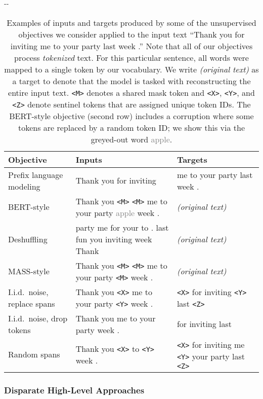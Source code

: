 \documentclass[twoside,11pt]{article}
\newlength{\offsetpage}
\newenvironment{widepage}{\begin{adjustwidth}{-\offsetpage}{-\offsetpage}\addtolength{\textwidth}{2\offsetpage}}{\end{adjustwidth}}
\begin{document}
\begin{table}
\footnotesize
\begin{widepage}
\centering
\begin{tabular}{l l l}
\toprule
    Objective & Inputs & Targets   \\
\midrule
    Prefix language modeling & Thank you for inviting & me to your party last week . \\
    BERT-style \cite{devlin2018bert} & Thank you \texttt{<M>} \texttt{<M>} me to your party \textcolor{gray}{apple} week . & \textit{(original text)}  \\
    Deshuffling & party me for your to . last fun you inviting week Thank & \textit{(original text)} \\
    MASS-style \cite{song2019mass} & Thank you \texttt{<M>} \texttt{<M>} me to your party \texttt{<M>} week . & \textit{(original text)} \\
    I.i.d.\ noise, replace spans & Thank you \texttt{<X>} me to your party \texttt{<Y>} week . & \texttt{<X>} for inviting \texttt{<Y>} last \texttt{<Z>} \\
    I.i.d.\ noise, drop tokens & Thank you me to your party week . & for inviting last \\
    Random spans & Thank you \texttt{<X>} to \texttt{<Y>} week . & \texttt{<X>} for inviting me \texttt{<Y>} your party last \texttt{<Z>} \\
\bottomrule
\end{tabular}
\end{widepage}
\caption{
Examples of inputs and targets produced by some of the unsupervised objectives we consider applied to the input text ``Thank you for inviting me to your party last week .''
Note that all of our objectives process \textit{tokenized} text. For this particular sentence, all words were mapped to a single token by our vocabulary.
We write \textit{(original text)} as a target to denote that the model is tasked with reconstructing the entire input text.
\texttt{<M>} denotes a shared mask token and \texttt{<X>}, \texttt{<Y>}, and \texttt{<Z>} denote sentinel tokens that are assigned unique token IDs.
The BERT-style objective (second row) includes a corruption where some tokens are replaced by a random token ID; we show this via the greyed-out word \textcolor{gray}{apple}.
}
\label{tab:objectives}
\end{table}

\subsubsection{Disparate High-Level Approaches}
\label{sec:objectives_highlevel}
\end{document}
